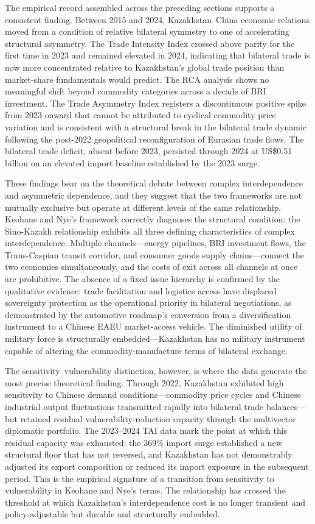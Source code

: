 \documentclass[12pt]{article}
\begin{document}
The empirical record assembled across the preceding sections supports a consistent finding. Between 2015 and 2024, Kazakhstan--China economic relations moved from a condition of relative bilateral symmetry to one of accelerating structural asymmetry. The Trade Intensity Index crossed above parity for the first time in 2023 and remained elevated in 2024, indicating that bilateral trade is now more concentrated relative to Kazakhstan's global trade position than market-share fundamentals would predict. The RCA analysis shows no meaningful shift beyond commodity categories across a decade of BRI investment. The Trade Asymmetry Index registers a discontinuous positive spike from 2023 onward that cannot be attributed to cyclical commodity price variation and is consistent with a structural break in the bilateral trade dynamic following the post-2022 geopolitical reconfiguration of Eurasian trade flows. The bilateral trade deficit, absent before 2023, persisted through 2024 at US\$0.51 billion on an elevated import baseline established by the 2023 surge.

These findings bear on the theoretical debate between complex interdependence and asymmetric dependence, and they suggest that the two frameworks are not mutually exclusive but operate at different levels of the same relationship. Keohane and Nye's framework correctly diagnoses the structural condition: the Sino-Kazakh relationship exhibits all three defining characteristics of complex interdependence. Multiple channels---energy pipelines, BRI investment flows, the Trans-Caspian transit corridor, and consumer goods supply chains---connect the two economies simultaneously, and the costs of exit across all channels at once are prohibitive. The absence of a fixed issue hierarchy is confirmed by the qualitative evidence: trade facilitation and logistics access have displaced sovereignty protection as the operational priority in bilateral negotiations, as demonstrated by the automotive roadmap's conversion from a diversification instrument to a Chinese EAEU market-access vehicle. The diminished utility of military force is structurally embedded---Kazakhstan has no military instrument capable of altering the commodity-manufacture terms of bilateral exchange.

The sensitivity--vulnerability distinction, however, is where the data generate the most precise theoretical finding. Through 2022, Kazakhstan exhibited high sensitivity to Chinese demand conditions---commodity price cycles and Chinese industrial output fluctuations transmitted rapidly into bilateral trade balances---but retained residual vulnerability-reduction capacity through the multivector diplomatic portfolio. The 2023--2024 TAI data mark the point at which this residual capacity was exhausted: the 369\% import surge established a new structural floor that has not reversed, and Kazakhstan has not demonstrably adjusted its export composition or reduced its import exposure in the subsequent period. This is the empirical signature of a transition from sensitivity to vulnerability in Keohane and Nye's terms. The relationship has crossed the threshold at which Kazakhstan's interdependence cost is no longer transient and policy-adjustable but durable and structurally embedded.
\end{document}
